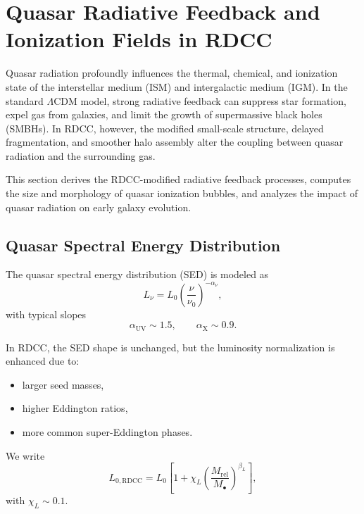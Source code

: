 \documentclass[11pt,a4paper]{article}
\begin{document}
\section{Quasar Radiative Feedback and Ionization Fields in RDCC}

Quasar radiation profoundly influences the thermal, chemical, and ionization state of the
interstellar medium (ISM) and intergalactic medium (IGM). In the standard $\Lambda$CDM
model, strong radiative feedback can suppress star formation, expel gas from galaxies, and
limit the growth of supermassive black holes (SMBHs). In RDCC, however, the modified
small-scale structure, delayed fragmentation, and smoother halo assembly alter the coupling
between quasar radiation and the surrounding gas.

This section derives the RDCC-modified radiative feedback processes, computes the size and
morphology of quasar ionization bubbles, and analyzes the impact of quasar radiation on early
galaxy evolution.

\subsection{Quasar Spectral Energy Distribution}

The quasar spectral energy distribution (SED) is modeled as
\begin{equation}
L_{\nu}
=
L_{0}
\left(
\frac{\nu}{\nu_{0}}
\right)^{-\alpha_{\nu}},
\end{equation}
with typical slopes
\begin{equation}
\alpha_{\mathrm{UV}} \sim 1.5,
\qquad
\alpha_{\mathrm{X}} \sim 0.9.
\end{equation}

In RDCC, the SED shape is unchanged, but the luminosity normalization is enhanced due to:
\begin{itemize}
\item larger seed masses,
\item higher Eddington ratios,
\item more common super-Eddington phases.
\end{itemize}

We write
\begin{equation}
L_{0,\mathrm{RDCC}}
=
L_{0}
\left[
1
+
\chi_{L}
\left(
\frac{M_{\mathrm{rel}}}{M_{\bullet}}
\right)^{\beta_{L}}
\right],
\end{equation}
with $\chi_{L} \sim 0.1$.
\end{document}
